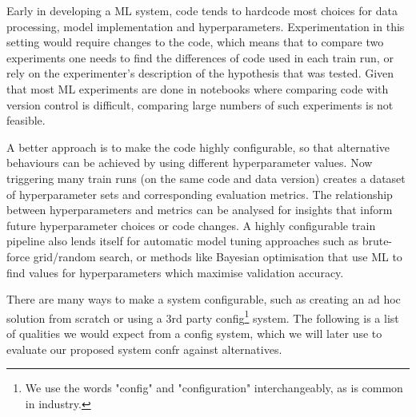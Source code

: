 \documentclass{itatnew}
\begin{document}
Early in developing a ML system, code tends to hardcode most choices for data processing, model implementation and hyperparameters.
Experimentation in this setting would require changes to the code, which means that to compare two experiments one needs to find the differences of code used in each train run, or rely on the experimenter's description of the hypothesis that was tested.
Given that most ML experiments are done in notebooks where comparing code with version control is difficult, comparing large numbers of such experiments is not feasible.

A better approach is to make the code highly configurable, so that alternative behaviours can be achieved by using different hyperparameter values.
Now triggering many train runs (on the same code and data version) creates a dataset of hyperparameter sets and corresponding evaluation metrics.
The relationship between hyperparameters and metrics can be analysed for insights that inform future hyperparameter choices or code changes.
A highly configurable train pipeline also lends itself for automatic model tuning approaches such as brute-force grid/random search, or methods like Bayesian optimisation that use ML to find values for hyperparameters which maximise validation accuracy.

There are many ways to make a system configurable, such as creating an ad hoc solution from scratch or using a 3rd party config\footnote{We use the words "config" and "configuration" interchangeably, as is common in industry.} system.
The following is a list of qualities we would expect from a config system, which we will later use to evaluate our proposed system confr against alternatives.
\end{document}
